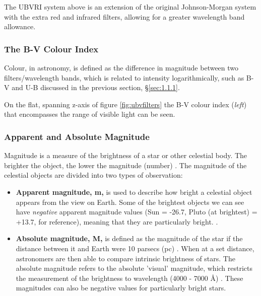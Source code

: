\documentclass[12pt]{article}
\begin{document}
The UBVRI system above is an extension of the original Johnson-Morgan system with the extra red and infrared filters, allowing for a greater wavelength band allowance.

\subsubsection{The B-V Colour Index} \label{sec:1.1.2}

Colour, in astronomy, is defined as the difference in magnitude between two filters/wavelength bands, which is related to intensity logarithmically, 
\cite{sdsscolour,rochcolour,librecolour} such as B-V and U-B discussed in the previous section, §\ref{sec:1.1.1}.

On the flat, spanning z-axis of figure \ref{fig:ubvfilters} the B-V colour index (\textit{left}) that encompasses the range of visible light can be seen.

\subsubsection{Apparent and Absolute Magnitude} \label{sec:1.1.3}

Magnitude is a measure of the brightness of a star or other celestial body. The brighter the object, the lower the magnitude (number)
\cite{britmag}.
The magnitude of the celestial objects are divided into two types of observation:

\begin{itemize}
    \item \textbf{Apparent magnitude, m,} is used to describe how bright a celestial object appears from the view on Earth. Some of the brightest objects we can see
    have \textit{negative} apparent magnitude values (Sun = -26.7, Pluto (at brightest) = +13.7, for reference), meaning that they are particularly bright.
    \cite{lcomag}.
    \item \textbf{Absolute magnitude, M,} is defined as the magnitude of the star if the distance between it and Earth were 10 parsecs (pc)
    \cite{lcoabsmag,cosmosabsmag}.
    When at a set distance, astronomers are then able to compare intrinsic brightness of stars. The absolute magnitude refers to the absolute 'visual' magnitude, which restricts
    the measurement of the brightness to wavelength (4000 - 7000 Å)
    \cite{cosmosabsmag}.
    These magnitudes can also be negative values for particularly bright stars.
\end{itemize}
\end{document}
